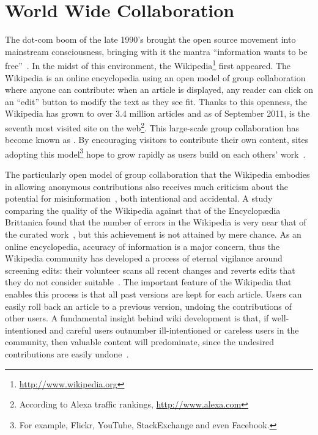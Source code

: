 \section{World Wide Collaboration}

The dot-com boom of the late 1990's brought the open source movement into
mainstream consciousness, bringing with it the mantra ``information
wants to be free''~\cite{wiki:Information-free}.
In the midst of this environment, the
Wikipedia\footnote{\url{http://www.wikipedia.org}}
first appeared.
The Wikipedia
is an online encyclopedia using an open model of group collaboration
where anyone can contribute: when an article is
displayed, any reader can click on an ``edit'' button to modify
the text as they see fit.
Thanks to this openness, the Wikipedia has grown to
over 3.4 million articles and as of September 2011,
is the seventh most visited site on the
web\footnote{According to Alexa traffic rankings, \url{http://www.alexa.com}}.
This large-scale group collaboration
has become known as .
By encouraging visitors to contribute their own content,
sites adopting this model\footnote{For example,
Flickr, YouTube, StackExchange and even Facebook.}
hope to grow rapidly as users build on each others' work~\cite{Taylor2007}.



The particularly open model of group collaboration that the Wikipedia embodies
in allowing anonymous contributions
also receives much criticism about the potential for
misinformation~\cite{Seigenthaler05,NewYorkTimes05a,Lehmann2006,NewZelandHerald06,Davis2006,Stross2006,Schiff2006,BBC2007},
both intentional and accidental.
A study comparing the quality of the Wikipedia against that
of the Encyclop{\ae}dia Brittanica found that the number of errors
in the Wikipedia is very near that of the curated work~\cite{Giles2005},
but this achievement is not attained by mere chance.
As an online encyclopedia, accuracy of information is a major concern,
thus the Wikipedia community has developed a process
of eternal vigilance around screening edits: their volunteer  scans all recent changes and reverts edits that they do not
consider suitable~\cite{wiki:RCPatrol}.
The important feature of the Wikipedia that enables this
process is that all past versions are kept for each article.
Users can easily roll back an article to a previous version,
undoing the contributions of other users.
A fundamental insight behind wiki development is that,
if well-intentioned and careful users outnumber ill-intentioned
or careless users in the community, then valuable content will predominate,
since the undesired contributions are easily undone~\cite{Leuf2001}.

